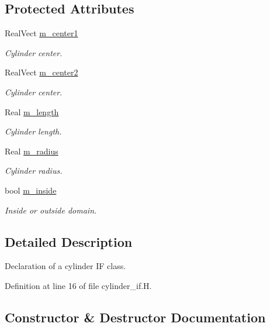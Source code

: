 \subsection*{Protected Attributes}
\begin{DoxyCompactItemize}
\item 
Real\+Vect \hyperlink{classcylinder__if_a549a899cf87b38231c3ea1c9ea6e79a3}{m\+\_\+center1}
\begin{DoxyCompactList}\small\item\em Cylinder center. \end{DoxyCompactList}\item 
Real\+Vect \hyperlink{classcylinder__if_aae028d170f0ff412a5f6298390ea42fa}{m\+\_\+center2}
\begin{DoxyCompactList}\small\item\em Cylinder center. \end{DoxyCompactList}\item 
Real \hyperlink{classcylinder__if_a4c1e727e668cee381abbb6b234a2ddf7}{m\+\_\+length}
\begin{DoxyCompactList}\small\item\em Cylinder length. \end{DoxyCompactList}\item 
Real \hyperlink{classcylinder__if_ae84dac74e682302f5504ea056f423453}{m\+\_\+radius}
\begin{DoxyCompactList}\small\item\em Cylinder radius. \end{DoxyCompactList}\item 
bool \hyperlink{classcylinder__if_adcd9b3e418ea54b000cae4cc71d5cb43}{m\+\_\+inside}
\begin{DoxyCompactList}\small\item\em Inside or outside domain. \end{DoxyCompactList}\end{DoxyCompactItemize}


\subsection{Detailed Description}
Declaration of a cylinder IF class. 

Definition at line 16 of file cylinder\+\_\+if.\+H.



\subsection{Constructor \& Destructor Documentation}
